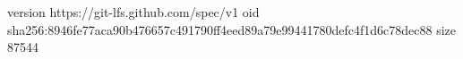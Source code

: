 version https://git-lfs.github.com/spec/v1
oid sha256:8946fe77aca90b476657c491790ff4eed89a79e99441780defc4f1d6c78dec88
size 87544
